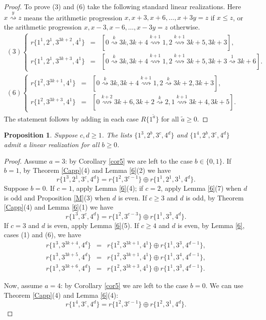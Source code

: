 \documentclass{amsart}
\newtheorem{prop}{Proposition}[section]
\theoremstyle{definition}
\numberwithin{equation}{section}
\def\ol{\oplus}
\newcommand{\art}[1]{\stackrel{#1}{\rightsquigarrow}}
\begin{document}
\begin{proof}
To prove (3) and (6) take the following standard linear realizations.
Here $x\art{y} z$ means the arithmetic progression $x,  x+3, x+6,\ldots,x+3y=z$ if $x\leq z$,
or the arithmetic progression $x,x-3,x-6,\ldots,x-3y=z$ otherwise.
$$\begin{array}{l}
(3) \left\{\begin{array}{rcl}
 r\{1^1,2^1, 3^{3k+2},4^1 \}  & = & [0\art{k} 3k, 3k+4 \art{k+1} 1, 2 \art{k+1}  3k+5, 3k+3],\\
 r\{1^1,2^1, 3^{3k+3},4^1 \}  & = & [0\art{k} 3k, 3k+4 \art{k+1} 1, 2 \art{k+1}  3k+5, 3k+3\art{1} 3k+6].
 \end{array}\right.\\[12pt]
 (6) \left\{\begin{array}{rcl}
 r\{1^2, 3^{3k+1},4^1 \}  & = & [0\art{k} 3k, 3k+4 \art{k+1} 1, 2 \art{k}  3k+2, 3k+3],\\
 r\{1^2, 3^{3k+3},4^1 \}  & = & [0\art{k+2} 3k+6, 3k+2 \art{k} 2, 1 \art{k+1}  3k+4, 3k+5].
 \end{array}\right.
  \end{array}$$
The statement follows by adding in each case $R\{1^{\tilde a}\}$ for all $\tilde a\geq 0$.
   \end{proof}

\begin{prop}\label{a34}
Suppose $c,d\geq 1$.
The lists $\{1^3, 2^b, 3^c, 4^d\}$ and $\{1^4, 2^b, 3^c, 4^d\}$ admit a  linear realization for all $b\geq 0$.
\end{prop}

\begin{proof}
Assume $a=3$: by Corollary \ref{cor5} we are left to the case $b\in \{0,1\}$.
If $b=1$, by Theorem \ref{Capp}(4) and Lemma \ref{6}(2) we have
$$r\{1^3, 2^1, 3^c, 4^d\}=r\{1^2, 3^{c-1}\}\ol r\{1^1, 2^1, 3^1, 4^d\}.$$
Suppose $b=0$.  If $c=1$, apply Lemma \ref{6}(4);
if $c=2$, apply  Lemma \ref{6}(7)  when $d$ is odd and Proposition \ref{M}(3)  when $d$ is even.
If $c\geq 3$ and $d$ is odd, by Theorem \ref{Capp}(4) and Lemma \ref{6}(1) we have
$$r\{1^3, 3^c, 4^d\}=r\{1^2, 3^{c-3}\} \ol r\{1^1, 3^3, 4^d\}.$$
If $c=3$ and $d$ is even, apply  Lemma \ref{6}(5).
If $c\geq 4$ and $d$ is even,  by Lemma \ref{6}, cases (1) and (6), we have
$$\begin{array}{rcl}
r\{1^3, 3^{3k+4}, 4^d\} & = & r\{1^2, 3^{3k+1},4^1\} \ol r\{1^1, 3^3, 4^{d-1}\},\\
r\{1^3, 3^{3k+5}, 4^d\} & = & r\{1^2, 3^{3k+1},4^1\} \ol r\{1^1, 3^4, 4^{d-1}\},\\
r\{1^3, 3^{3k+6}, 4^d\} & = & r\{1^2, 3^{3k+3},4^1\} \ol r\{1^1, 3^3, 4^{d-1}\}.
  \end{array}$$

Now, assume $a=4$: by Corollary \ref{cor5} we are left to the case $b=0$.
We can use Theorem \ref{Capp}(4) and Lemma \ref{6}(4):
$$r\{1^4,  3^c, 4^d\} =  r\{1^2, 3^{c-1}\} \ol r\{1^2, 3^1, 4^d\}.$$
\end{proof}
\end{document}
